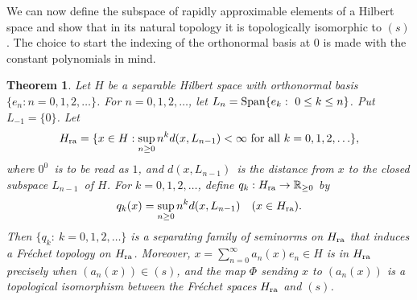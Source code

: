 \documentclass[12pt, reqno]{amsart}
\numberwithin{equation}{section}
\theoremstyle{plain}
\newtheorem{theorem}{Theorem}[section]
\theoremstyle{definition}
\begin{document}
We can now define the subspace of rapidly approximable elements of a Hilbert space and show that in its natural topology it is topologically isomorphic to $(s)$. The choice to start the indexing of the orthonormal basis at 0 is made with the constant polynomials in mind.
\begin{theorem}\label{the:HilbertFrechet}
Let $H$ be a separable Hilbert space with orthonormal basis $\{e_n : n=0,1,2,\ldots\}$. For $n=0,1,2,\ldots$, let $L_n=\textup{Span}\{e_k :\ 0\leq k\leq n\}$. Put $L_{-1}=\{0\}$. Let
\begin{equation*}
{H_{\textup{ra}}}=\{x\in H : \sup_{n\geq 0} n^kd(x,L_{n-1})<\infty \textup{ for all }k=0,1,2,\ldots\},
\end{equation*}
where $0^0$\ is to be read as $1$, and $d(x,L_{n-1})$\ is the distance from $x$ to the closed subspace $L_{n-1}$\ of $H$. For $k=0,1,2,\ldots$, define $q_k: {H_{\textup{ra}}}\to{{\mathbb R}}_{\geq 0}$ by
\begin{equation*}
q_k(x)=\sup_{n\geq 0} n^kd(x,L_{n-1})\quad(x\in {H_{\textup{ra}}}).
\end{equation*}
Then $\{q_k :\ k=0,1,2,\ldots\}$ is a separating family of seminorms on ${H_{\textup{ra}}}$ that induces a Fr\'echet topology on ${H_{\textup{ra}}}$. Moreover, $x=\sum_{n=0}^\infty a_n(x)e_n\in H$ is in ${H_{\textup{ra}}}$ precisely when ${({a_n(x)})}\in (s)$, and the map ${{\Phi}}$ sending $x$ to ${({a_n(x)})}$ is a topological isomorphism between the Fr\'echet spaces ${H_{\textup{ra}}}$ and $(s)$.
\end{theorem}
\end{document}
